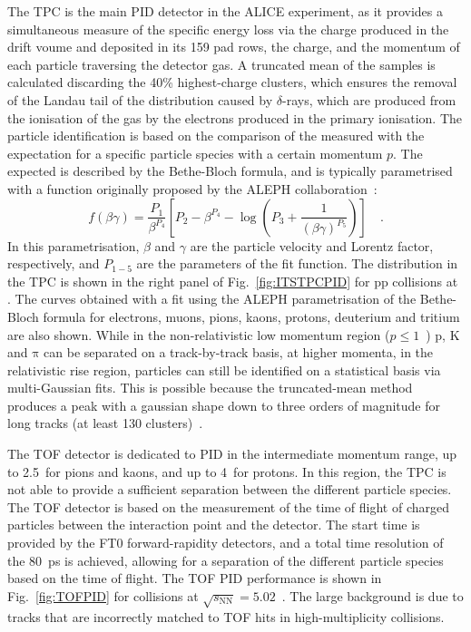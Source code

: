 The TPC is the main PID detector in the ALICE experiment, as it provides a simultaneous measure of the specific energy loss via the charge produced in the drift voume and deposited in its 159 pad rows, the charge, and the momentum of each particle traversing the detector gas. A truncated mean of the \dedx samples is calculated discarding the 40\% highest-charge clusters, which ensures the removal of the Landau tail of the \dedx distribution caused by $\delta$-rays, which are produced from the ionisation of the gas by the electrons produced in the primary ionisation. The particle identification is based on the comparison of the measured \dedx with the expectation for a specific particle species with a certain momentum $p$. The expected \dedx is described by the Bethe-Bloch formula, and is typically parametrised with a function originally proposed by the ALEPH collaboration~\cite{Blum:2008nqe}:
\begin{equation*}
    f(\beta\gamma) = \frac{P_1}{\beta^{P_4}}\left[P_2 - \beta^{P_4} - \log\left(P_3 + \frac{1}{(\beta\gamma)^{P_5}}\right)\right]\quad .
\end{equation*}
In this parametrisation, $\beta$ and $\gamma$ are the particle velocity and Lorentz factor, respectively, and $P_{1-5}$ are the parameters of the fit function. The \dedx distribution in the TPC is shown in the right panel of Fig.~\ref{fig:ITSTPCPID} for pp collisions at \thirteen. The curves obtained with a fit using the ALEPH parametrisation of the Bethe-Bloch formula for electrons, muons, pions, kaons, protons, deuterium and tritium are also shown. While in the non-relativistic low momentum region ($p \leq 1$~\gevc) p, K and $\mathrm{\pi}$ can be separated on a track-by-track basis, at higher momenta, in the relativistic rise region, particles can still be identified on a statistical basis via multi-Gaussian fits. This is possible because the truncated-mean method produces a \dedx peak with a gaussian shape down to three orders of magnitude for long tracks (at least 130 clusters)~\cite{ALICE:2014sbx}.

The TOF detector is dedicated to PID in the intermediate momentum range, up to 2.5~\gevc for pions and kaons, and up to 4~\gevc for protons. In this region, the TPC is not able to provide a sufficient separation between the different particle species. The TOF detector is based on the measurement of the time of flight of charged particles between the interaction point and the detector. The start time is provided by the FT0 forward-rapidity detectors, and a total time resolution of the 80~ps is achieved, allowing for a separation of the different particle species based on the time of flight. The TOF PID performance is shown in Fig.~\ref{fig:TOFPID} for \pbpb collisions at $\sqrt{s_\mathrm{NN}} = 5.02$~\tev. The large background is due to tracks that are incorrectly matched to TOF hits in high-multiplicity \pbpb collisions.

